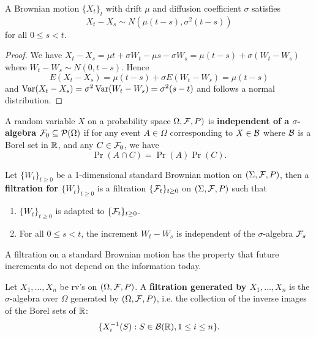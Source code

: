 \documentclass[11pt,fleqn]{book} %
\begin{document}
\begin{proposition} \label{prop:324}
A Brownian motion \(\{X_t\}_t\) with drift \(\mu\) and diffusion coefficient \(\sigma\) satisfies
\[
X_t - X_s \sim N(\mu(t - s), \sigma^2(t - s))
\]
for all \(0 \leq s < t\).
\end{proposition}
\begin{proof} We have \(X_t - X_s = \mu t + \sigma W_t - \mu s - \sigma W_s = \mu(t - s)+\sigma(W_t - W_s)\) where \(W_t - W_s \sim N(0, t - s)\). Hence
\[
E(X_t - X_s) = \mu(t - s) + \sigma E(W_t - W_s) = \mu(t - s)
\]
and \(\operatorname{Var}(X_t - X_s) = \sigma^2\operatorname{Var}(W_t - W_s) = \sigma^2(s - t)\) and follows a normal distribution.
\end{proof}

\begin{definition} \label{def:325}
A random variable \(X\) on a probability space \(\Omega, \mathcal{F}, P)\) is \textbf{independent of a \(\sigma\)-algebra} \(\mathcal{F}_0 \subseteq \mathcal{P}(\Omega)\) if for any event \(A \in \Omega\) corresponding to \(X \in \mathcal{B}\) where \(\mathcal{B}\) is a Borel set in \(\mathbb{R}\), and any \(C \in \mathcal{F}_0\), we have
\[
\Pr(A \cap C) = \Pr(A)\Pr(C).
\]
\end{definition}

\begin{definition} \label{def:326}
Let \(\{W_t\}_{t \geq 0}\) be a 1-dimensional standard Brownian motion on \((\Sigma, \mathcal{F}, P)\), then a \textbf{filtration for \(\{W_t\}_{t \geq 0}\)} is a filtration \(\{\mathcal{F}_t\}_{t \geq 0}\) on \((\Sigma, \mathcal{F}, P)\) such that
\begin{enumerate}
    \item \(\{W_t\}_{t\geq0}\) is adapted to \(\{\mathcal{F}_t\}_{t\geq0}\).
    \item For all \(0 \leq s < t\), the increment \(W_t - W_s\) is independent of the \(\sigma\)-algebra \(\mathcal{F}_s\)
\end{enumerate}
\end{definition}

\begin{remark} \label{rmk:327}
A filtration on a standard Brownian motion has the property that future increments do not depend on the information today.
\end{remark}

\begin{definition} \label{def:328}
Let \(X_1, \ldots, X_n\) be rv's on \((\Omega, \mathcal{F}, P)\). A \textbf{filtration generated by \(X_1, \ldots, X_n\)} is the \(\sigma\)-algebra over \(\Omega\) generated by \((\Omega, \mathcal{F}, P)\), i.e. the collection of the inverse images of the Borel sets of \(\mathbb{R}\):
\[
\{X_i^{-1}(S): S \in \mathcal{B}(\mathbb{R}), 1 \leq i \leq n\}.
\]
\end{definition}
\end{document}
